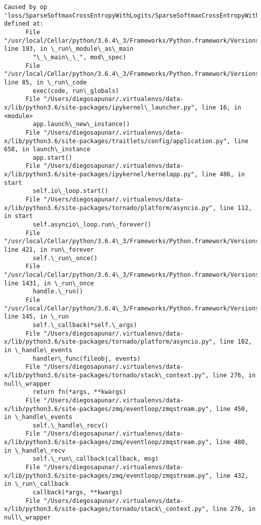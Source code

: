 \documentclass[11pt]{article}
\begin{document}
\begin{Verbatim}[commandchars=\\\{\}]
    Caused by op 'loss/SparseSoftmaxCrossEntropyWithLogits/SparseSoftmaxCrossEntropyWithLogits', defined at:
      File "/usr/local/Cellar/python/3.6.4\_3/Frameworks/Python.framework/Versions/3.6/lib/python3.6/runpy.py", line 193, in \_run\_module\_as\_main
        "\_\_main\_\_", mod\_spec)
      File "/usr/local/Cellar/python/3.6.4\_3/Frameworks/Python.framework/Versions/3.6/lib/python3.6/runpy.py", line 85, in \_run\_code
        exec(code, run\_globals)
      File "/Users/diegosapunar/.virtualenvs/data-x/lib/python3.6/site-packages/ipykernel\_launcher.py", line 16, in <module>
        app.launch\_new\_instance()
      File "/Users/diegosapunar/.virtualenvs/data-x/lib/python3.6/site-packages/traitlets/config/application.py", line 658, in launch\_instance
        app.start()
      File "/Users/diegosapunar/.virtualenvs/data-x/lib/python3.6/site-packages/ipykernel/kernelapp.py", line 486, in start
        self.io\_loop.start()
      File "/Users/diegosapunar/.virtualenvs/data-x/lib/python3.6/site-packages/tornado/platform/asyncio.py", line 112, in start
        self.asyncio\_loop.run\_forever()
      File "/usr/local/Cellar/python/3.6.4\_3/Frameworks/Python.framework/Versions/3.6/lib/python3.6/asyncio/base\_events.py", line 421, in run\_forever
        self.\_run\_once()
      File "/usr/local/Cellar/python/3.6.4\_3/Frameworks/Python.framework/Versions/3.6/lib/python3.6/asyncio/base\_events.py", line 1431, in \_run\_once
        handle.\_run()
      File "/usr/local/Cellar/python/3.6.4\_3/Frameworks/Python.framework/Versions/3.6/lib/python3.6/asyncio/events.py", line 145, in \_run
        self.\_callback(*self.\_args)
      File "/Users/diegosapunar/.virtualenvs/data-x/lib/python3.6/site-packages/tornado/platform/asyncio.py", line 102, in \_handle\_events
        handler\_func(fileobj, events)
      File "/Users/diegosapunar/.virtualenvs/data-x/lib/python3.6/site-packages/tornado/stack\_context.py", line 276, in null\_wrapper
        return fn(*args, **kwargs)
      File "/Users/diegosapunar/.virtualenvs/data-x/lib/python3.6/site-packages/zmq/eventloop/zmqstream.py", line 450, in \_handle\_events
        self.\_handle\_recv()
      File "/Users/diegosapunar/.virtualenvs/data-x/lib/python3.6/site-packages/zmq/eventloop/zmqstream.py", line 480, in \_handle\_recv
        self.\_run\_callback(callback, msg)
      File "/Users/diegosapunar/.virtualenvs/data-x/lib/python3.6/site-packages/zmq/eventloop/zmqstream.py", line 432, in \_run\_callback
        callback(*args, **kwargs)
      File "/Users/diegosapunar/.virtualenvs/data-x/lib/python3.6/site-packages/tornado/stack\_context.py", line 276, in null\_wrapper

\end{Verbatim}
\end{document}
